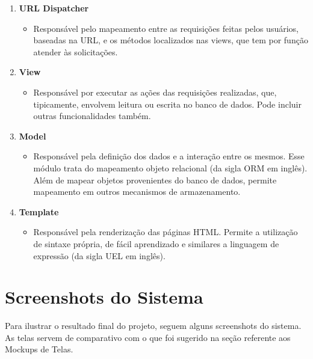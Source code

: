 \documentclass[graduacao,brazil]{ThesisPUC}
\begin{document}
\begin{enumerate}
    \item \textbf{URL Dispatcher}
    \begin{itemize}
	\item Respons\'{a}vel pelo mapeamento entre as requisi\c{c}\~{o}es feitas pelos usu\'{a}rios, baseadas na URL, 
	      e os m\'{e}todos localizados nas views, que tem por fun\c{c}\~{a}o atender \`{a}s solicita\c{c}\~{o}es.
    \end{itemize}
    \item \textbf{View}
    \begin{itemize}
	\item Respons\'{a}vel por executar as a\c{c}\~{o}es das requisi\c{c}\~{o}es realizadas, que, tipicamente,
	      envolvem leitura ou escrita no banco de dados. Pode incluir outras funcionalidades tamb\'{e}m.
    \end{itemize}
    \item \textbf{Model}
    \begin{itemize}
	\item Respons\'{a}vel pela defini\c{c}\~{a}o dos dados e a intera\c{c}\~{a}o entre os mesmos. Esse m\'{o}dulo
	      trata do mapeamento objeto relacional (da sigla ORM em ingl\^{e}s). Além de mapear objetos provenientes
	      do banco de dados, permite mapeamento em outros mecanismos de armazenamento.
    \end{itemize}
    \item \textbf{Template}
    \begin{itemize}
	\item Respons\'{a}vel pela renderiza\c{c}\~{a}o das p\'{a}ginas HTML. Permite a utiliza\c{c}\~{a}o de sintaxe
	      pr\'{o}pria, de f\'{a}cil aprendizado e similares a linguagem de express\~{a}o (da sigla UEL em ingl\^{e}s).
    \end{itemize}
\end{enumerate}


\section{Screenshots do Sistema}

Para ilustrar o resultado final do projeto, seguem alguns screenshots do sistema.
As telas servem de comparativo com o que foi sugerido na se\c{c}\~{a}o referente aos Mockups de Telas.
\end{document}
